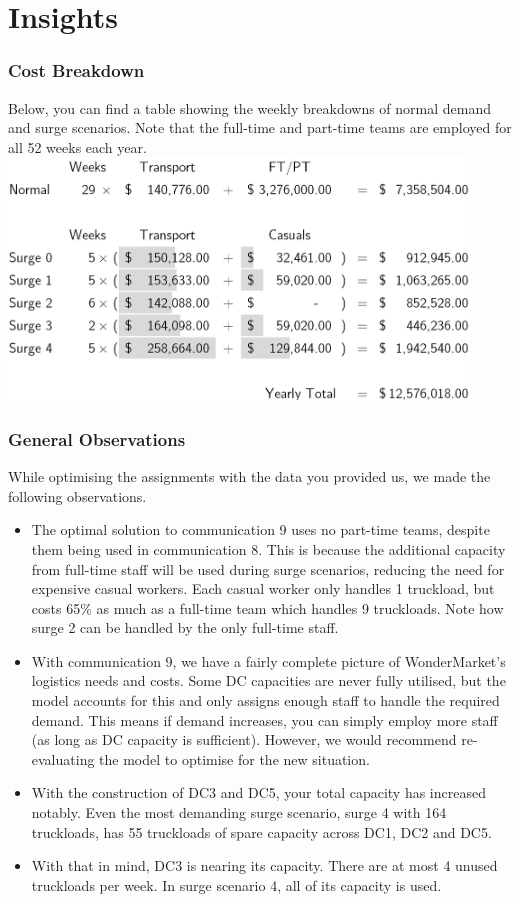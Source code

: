 \documentclass[11pt,a4paper]{article}
\begin{document}
\newpage
\part{Insights}
\section{Cost Breakdown}
Below, you can find a table showing the weekly breakdowns of normal 
demand and surge scenarios. Note that the full-time and part-time 
teams are employed for all 52 weeks each year. \\[1.5em]
\includegraphics[width=33em]{table.PNG}

\section{General Observations}
While optimising the assignments with the data you provided us, we made 
the following observations.
\begin{itemize}
    \item The optimal solution to communication 9 uses no part-time teams, despite 
    them being used in communication 8. This is because the additional 
    capacity from full-time staff will be used during surge
     scenarios, reducing the need for expensive casual workers. Each casual worker only 
     handles 1 truckload, but costs 65\% as much as a full-time team which handles 
     9 truckloads. Note how 
     surge 2 can be handled by the only full-time staff.
    \item With communication 9, we have a fairly complete picture of WonderMarket's
    logistics needs and costs. Some DC capacities are never fully utilised, 
    but the model accounts for this and only assigns enough staff to handle 
    the required demand. This means if demand increases, you can simply employ more 
    staff (as long as DC capacity is sufficient). However, we would recommend
    re-evaluating the model to optimise for the new situation.
    \item With the construction of DC3 and DC5, your total capacity has increased 
    notably. Even the most demanding surge scenario, surge 4 with 164 truckloads,
    has 55 truckloads of spare capacity across DC1, DC2 and DC5.
    \item With that in mind, DC3 is nearing its capacity. There are at most  
    4 unused truckloads per week. In surge scenario 4, all of its 
    capacity is used. 
\end{itemize}
\end{document}
